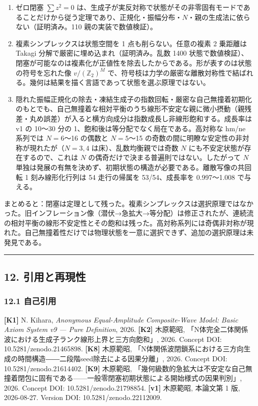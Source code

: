 \documentclass[
  10pt,
  a4paper,
]{ltjsarticle}
\providecommand{\tightlist}{%
  \setlength{\itemsep}{0pt}\setlength{\parskip}{0pt}}
\begin{document}
\begin{enumerate}
\def\labelenumi{\arabic{enumi}.}
\tightlist
\item
  ゼロ閉塞 \(\sum z^2=0\)
  は、生成子が実反対称で状態がその非零固有モードであることだけから従う定理であり、正規化・振幅分布・\(N\)・親の生成法に依らない（証明済み。110
  親の実装で数値検証）。
\item
  複素シンプレックスは状態空間を 1 点も削らない。任意の複素 2 乗距離は
  Takagi 分解で厳密に埋め込まれ（証明済み。乱数 1400
  状態で数値検証）、閉塞が可能なのは複素化が正値性を除去したからである。形が表すのは状態の符号を忘れた像
  \(v/(\mathbb Z_2)^M\)
  で、符号枝は力学の厳密な離散対称性で結ばれる。幾何は結果を描く言語であって状態を選ぶ原理ではない。
\item
  隠れた振幅正規化の除去・凍結生成子の指数回転・厳密な自己無撞着初期化のもとでも、自己無撞着な相対平衡のうち線形不安定な親に微小摂動（親残差・丸め誤差）が入ると横方向成分は指数成長し非線形飽和する。成長率は
  v1 の 10〜30 分の 1、飽和後は等分配でなく局在である。高対称な hm/ne
  系列では \(N=6\)〜16 の偶数と \(N=5\)〜15
  の奇数の間に明瞭な安定性の非対称が現れたが（\(N=3,4\)
  は床）、乱数均衡親では奇数 \(N\) にも不安定状態が存在するので、これは
  \(N\) の偶奇だけで決まる普遍則ではない。したがって \(N\)
  単独は発展の有無を決めず、初期状態の構造が必要である。離散写像の共回転
  1 刻み線形化行列は 54 走行の帰属を 53/54、成長率を 0.997〜1.008
  で与える。
\end{enumerate}

まとめると：閉塞は定理として残った。複素シンプレックスは選択原理ではなかった。旧インフレーション像（潜伏→急拡大→等分配）は修正されたが、連続流の相対平衡の線形不安定性とその飽和は残った。高対称系列には奇偶非対称が現れた。自己無撞着性だけでは物理状態を一意に選択できず、追加の選択原理は未発見である。

\begin{center}\rule{0.5\linewidth}{0.5pt}\end{center}

\subsection{12.
引用と再現性}\label{ux5f15ux7528ux3068ux518dux73feux6027}

\subsubsection{12.1 自己引用}\label{ux81eaux5df1ux5f15ux7528}

\textbf{{[}K1{]}} N. Kihara, \emph{Anonymous Equal-Amplitude
Composite-Wave Model: Basic Axiom System v9 --- Pure Definition}, 2026.
\textbf{{[}K2{]}} 木原範昭,
「N体完全二体関係波における生成子ランク線形上界と三方向飽和」, 2026.
Concept DOI: 10.5281/zenodo.21465898. \textbf{{[}K8{]}} 木原範昭,
「N体関係波閉鎖系における三方向生成の時間構造――二段階seed除去による因果分離」,
2026. Concept DOI: 10.5281/zenodo.21614402. \textbf{{[}K9{]}} 木原範昭,
「幾何級数的急拡大は不安定な自己無撞着閉包に固有である------一般零閉塞初期状態による開始様式の因果判別」,
2026. Concept DOI: 10.5281/zenodo.21798854. \textbf{{[}v1{]}} 木原範昭,
本論文第 1 版, 2026-08-27. Version DOI: 10.5281/zenodo.22112009.
\end{document}
